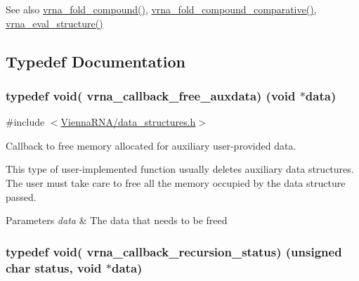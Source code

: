 \begin{DoxySeeAlso}{See also}
\hyperlink{group__fold__compound_ga6601d994ba32b11511b36f68b08403be}{vrna\+\_\+fold\+\_\+compound()}, \hyperlink{group__fold__compound_gad6bacc816af274922b13d947f708aa0c}{vrna\+\_\+fold\+\_\+compound\+\_\+comparative()}, \hyperlink{group__eval_ga58f199f1438d794a265f3b27fc8ea631}{vrna\+\_\+eval\+\_\+structure()} 
\end{DoxySeeAlso}


\subsection{Typedef Documentation}
\hypertarget{group__fold__compound_ga3ae51bfd5fc3236652d1de4e3274b49b}{}
\subsubsection[{vrna\+\_\+callback\+\_\+free\+\_\+auxdata}]{\setlength{\rightskip}{0pt plus 5cm}typedef void( vrna\+\_\+callback\+\_\+free\+\_\+auxdata) (void $\ast$data)}\label{group__fold__compound_ga3ae51bfd5fc3236652d1de4e3274b49b}


{\ttfamily \#include $<$\hyperlink{data__structures_8h}{Vienna\+R\+N\+A/data\+\_\+structures.\+h}$>$}



Callback to free memory allocated for auxiliary user-\/provided data. 

This type of user-\/implemented function usually deletes auxiliary data structures. The user must take care to free all the memory occupied by the data structure passed.


\begin{DoxyParams}{Parameters}
{\em data} & The data that needs to be free\textquotesingle{}d \\
\hline
\end{DoxyParams}
\hypertarget{group__fold__compound_ga4a4a0d838de6d18315bafc84f93f5cc0}{}
\subsubsection[{vrna\+\_\+callback\+\_\+recursion\+\_\+status}]{\setlength{\rightskip}{0pt plus 5cm}typedef void( vrna\+\_\+callback\+\_\+recursion\+\_\+status) (unsigned char status, void $\ast$data)}\label{group__fold__compound_ga4a4a0d838de6d18315bafc84f93f5cc0}


